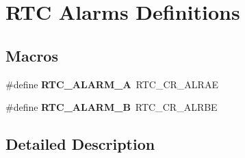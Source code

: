 \hypertarget{group___r_t_c___alarms___definitions}{}\section{R\+TC Alarms Definitions}
\label{group___r_t_c___alarms___definitions}
\subsection*{Macros}
\begin{DoxyCompactItemize}
\item 
\mbox{\label{group___r_t_c___alarms___definitions_ga916bcb75517157e284344f96ac275639}} 
\#define {\bfseries R\+T\+C\+\_\+\+A\+L\+A\+R\+M\+\_\+A}~R\+T\+C\+\_\+\+C\+R\+\_\+\+A\+L\+R\+AE
\item 
\mbox{\label{group___r_t_c___alarms___definitions_ga55b831e961f8f4b91ec17939eb78b440}} 
\#define {\bfseries R\+T\+C\+\_\+\+A\+L\+A\+R\+M\+\_\+B}~R\+T\+C\+\_\+\+C\+R\+\_\+\+A\+L\+R\+BE
\end{DoxyCompactItemize}


\subsection{Detailed Description}
